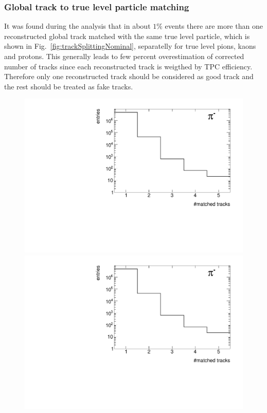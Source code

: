 \subsubsection{Global track to true level particle matching}
It was found during the analysis that in about $1\%$ events there are more than one reconstructed global track matched with the same true level particle, which is shown in Fig.~\ref{fig:trackSplittingNominal}, separatelly for true level pions, kaons and protons. This generally leads to few percent overestimation of corrected number of tracks since each reconstructed track is weigthed by TPC efficiency. Therefore only one reconstructed track should be considered as good track and the rest should be treated as fake tracks. 
\begin{figure}[ht]
	\centering
	\parbox{0.329\textwidth}{
		\centering
		\includegraphics[width=\linewidth,page=1]{graphics/eff/trackSplitting_CD.pdf}\\
		\includegraphics[width=\linewidth,page=4]{graphics/eff/trackSplitting_CD.pdf}\\
}
\end{figure}
